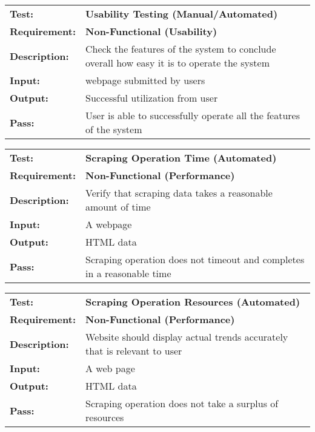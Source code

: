\documentclass{article}
\begin{document}
	\begin{mdframed}[linewidth=1pt]
	\begin{tabularx}{\textwidth}{@{}p{3cm}X@{}}
	{\bf Test:} & {\bf Usability Testing (Manual/Automated)}\\[\baselineskip]
	{\bf Requirement:} & {\bf Non-Functional (Usability)}\\[\baselineskip]
	{\bf Description:} & Check the features of the system to conclude overall how easy it is to operate the system\\[0.5\baselineskip]
	{\bf Input:} &  webpage submitted by users\\[0.5\baselineskip]
	{\bf Output:} & Successful utilization from user \\[0.5\baselineskip]
	{\bf Pass:} & User is able to successfully operate all the features of the system
	\end{tabularx}
	\end{mdframed}


	\begin{mdframed}[linewidth=1pt]
	\begin{tabularx}{\textwidth}{@{}p{3cm}X@{}}
	{\bf Test:} & {\bf Scraping Operation Time (Automated)}\\[\baselineskip]
	{\bf Requirement:} & {\bf Non-Functional (Performance)}\\[\baselineskip]
	{\bf Description:} & Verify that scraping data takes a reasonable amount of time\\[0.5\baselineskip]
	{\bf Input:} &  A webpage \\[0.5\baselineskip]
	{\bf Output:} & HTML data \\[0.5\baselineskip]
	{\bf Pass:} & Scraping operation does not timeout and completes in a reasonable time
	\end{tabularx}
	\end{mdframed}


	\begin{mdframed}[linewidth=1pt]
	\begin{tabularx}{\textwidth}{@{}p{3cm}X@{}}
	{\bf Test:} & {\bf Scraping Operation Resources (Automated)}\\[\baselineskip]
	{\bf Requirement:} & {\bf Non-Functional (Performance)}\\[\baselineskip]
	{\bf Description:} & Website should display actual trends accurately that is relevant to user\\[0.5\baselineskip]
	{\bf Input:} &  A web page \\[0.5\baselineskip]
	{\bf Output:} & HTML data \\[0.5\baselineskip]
	{\bf Pass:} & Scraping operation does not take a surplus of resources
	\end{tabularx}
	\end{mdframed}
\end{document}
